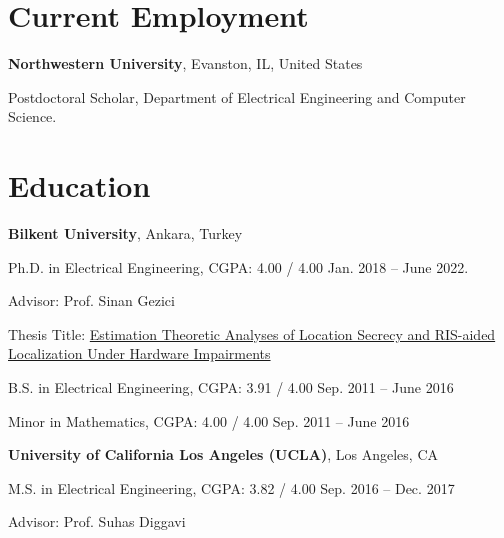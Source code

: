 \section{Current Employment}
\textbf{Northwestern University}, Evanston, IL, United States
\begin{outerlist}
	\item[] Postdoctoral Scholar, Department of Electrical Engineering and Computer Science.
\end{outerlist}
\section{Education}
\textbf{Bilkent University}, Ankara, Turkey
\begin{outerlist}
    \item[] Ph.D. in Electrical Engineering, CGPA: 4.00 / 4.00  \hfill   Jan. 2018 -- June 2022.
    \begin{innerlist}
    \item Advisor: Prof. Sinan Gezici
    \item Thesis Title: \href{https://repository.bilkent.edu.tr/items/73b0b4ed-1839-43aa-b205-c0213b1e346d}{Estimation Theoretic Analyses of Location Secrecy and RIS-aided Localization Under Hardware Impairments}
    \end{innerlist}
  \item [] B.S. in Electrical Engineering, CGPA: 3.91 / 4.00 \hfill  Sep. 2011 -- June 2016\\	
  \halfblankline
  \item []Minor in Mathematics, CGPA: 4.00 / 4.00 \hfill Sep. 2011 -- June 2016	
\end{outerlist}
\vspace{0.3cm}

\textbf{University of California Los Angeles (UCLA)}, Los Angeles, CA
\begin{outerlist}
    \item [] M.S. in Electrical Engineering, CGPA: 3.82 / 4.00 \hfill  Sep. 2016 -- Dec. 2017
    \begin{innerlist}
    \item Advisor: Prof. Suhas Diggavi
    \end{innerlist}
    
 
\end{outerlist}

